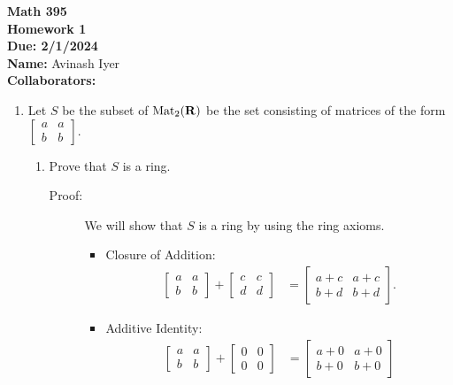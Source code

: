 \documentclass[11pt]{article}
\begin{document}
\begin{center}
{\bf \Large Math 395 \\[0.1in]Homework 1 \\[0.1in]
Due: 2/1/2024}\\[.25in]
{\bf Name:} {Avinash Iyer}\\[0.15in]
{\bf Collaborators:} {\underline{\hspace*{4.5in}}} \\
\end{center}

\begin{enumerate}

\item Let $S$ be the subset of $\operatorname{Mat}_{2}(\mathbf{R})$  be the set consisting of matrices of the form $\begin{bmatrix} a & a \\ b & b \end{bmatrix}$. 
\begin{enumerate}
\item Prove that $S$ is a ring.\\
  \begin{description}
    \item[Proof:] We will show that $S$ is a ring by using the ring axioms.
      \begin{itemize}
        \item Closure of Addition:
          \begin{align*}
            \begin{bmatrix} a & a \\ b&b\end{bmatrix} + \begin{bmatrix} c&c\\d&d\end{bmatrix} &= \begin{bmatrix} a+c & a+c\\b+d & b+d\end{bmatrix}.
          \end{align*}
        \item Additive Identity:
          \begin{align*}
            \begin{bmatrix} a&a\\b&b\end{bmatrix} + \begin{bmatrix} 0&0\\0&0\end{bmatrix} &= \begin{bmatrix} a+0 & a+0\\b+0 & b+0\end{bmatrix}\\

\end{align*}
\end{itemize}
\end{description}
\end{enumerate}
\end{enumerate}
\end{document}
